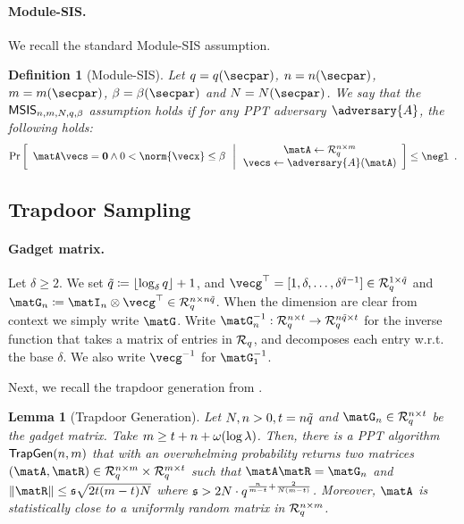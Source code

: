 \documentclass[11pt,letterpaper]{article}
\newcounter{theo}[section]
\newtheorem{definition}[theorem]{Definition}
\newtheorem{lemma}[theorem]{Lemma}
\theoremstyle{definition} %
\newcommand{\from}{\gets}
\begin{document}
\paragraph{Module-SIS.} We recall the standard Module-SIS \cite{DBLP:journals/dcc/LangloisS15} assumption.

\begin{definition}[Module-SIS]\label{def:msis}
	 Let $q = q(\secpar)$, $n = n(\secpar)$, $m = m(\secpar)$, $\beta = \beta(\secpar)$ and $N = N(\secpar)$. We say that the $\mathsf{MSIS}_{n,m,N,q,\beta}$ assumption holds if for any PPT adversary $\adversary{A}$, the following holds:
	\begin{equation*}
		\CProb{
			\begin{array}{c}
				\matA \vecs = \veczero \land 
				0 < \norm{\vecx} \leq \beta
			\end{array}
		}
		{ 
			\begin{array}{c}
				\matA\from \Rq^{n \times m}\\
				\vecs \from \adversary{A}(\matA)
			\end{array}
		} \leq \negl \enspace.
	\end{equation*}
\end{definition}
\subsection{Trapdoor Sampling}

\paragraph{Gadget matrix.} Let $\delta \geq 2$. We set ${\tilde{q}} \coloneqq \lfloor \log_\delta q \rfloor + 1$, and $\vecg^\top = [1, \delta, \dots, \delta^{\q - 1}] \in \R_q^{1 \times \q}$ and $\matG_n \coloneqq \matI_n \otimes \vecg^\top \in \R_q^{n \times n\q}$. When the dimension are clear from context we simply write $\matG$.
  Write $\matG^{-1}_n: \Rq^{n \times t} \to \Rq^{n\q \times t}$ for the inverse function that takes a matrix of entries in $\mathcal{R}_q$, and  decomposes each entry w.r.t. the base $\delta$.
  We also write $\vecg^{-1}$ for $\matG_1^{-1}$.

Next, we recall the trapdoor generation from \cite{DBLP:conf/eurocrypt/MicciancioP12,FenNgu23}.
\begin{lemma}[Trapdoor Generation]
  \label{lemma:genTrapdoor}
  Let $N,n>0, t = n{\tilde{q}}$ and $\matG_n \in \Rq^{n \times t}$ be the gadget matrix. Take $ m \geq t + n + \omega(\log \lambda)$. Then, there is a PPT algorithm $\mathsf{TrapGen}(n, m)$ that with an overwhelming probability returns two matrices $(\matA, \matR) \in \Rq^{n \times m} \times \Rq^{m \times t}$ such that $\matA \matR = \matG_n$ and  $\|\matR\| \leq  \stdev\sqrt{2t(m-t)N}$ where $\mathfrak{s} > 2N \cdot q^{\frac{n}{m-t} + \frac{2}{N(m-t)}}$. Moreover, $\matA$ is statistically close to a uniformly random matrix in $\mathcal{R}_q^{n \times m}$.
\end{lemma}
\end{document}
